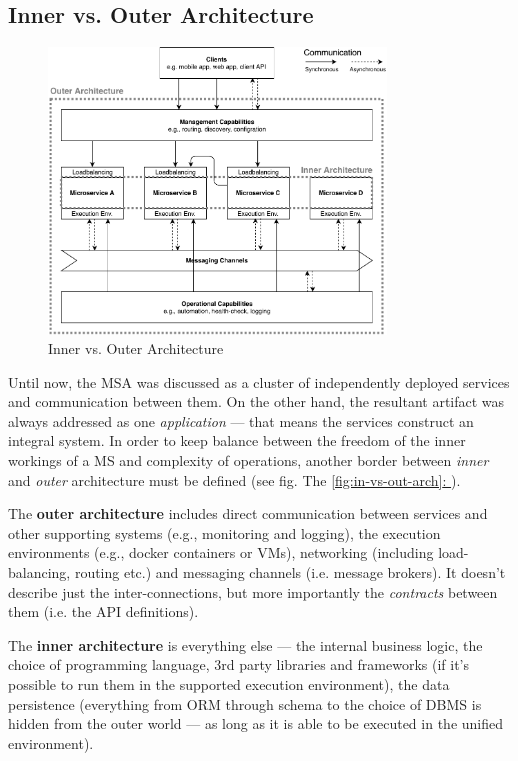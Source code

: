 \documentclass[thesis=M,english,hidelinks]{FITthesis}[2012/10/20]
\newcommand*{\fullref}[1]{\hyperref[{#1}]{\autoref*{#1}: \textit{\nameref*{#1}}}}
\begin{document}
\subsection{Inner vs. Outer Architecture}

\begin{figure}
  \centering
    \includegraphics[width=0.8\textwidth]{images/architecture_inner_vs_outer.pdf}
    \caption{Inner vs. Outer Architecture}
  \label{fig:in-vs-out-arch}
\end{figure}

Until now, the \acrshort{MSA} was discussed as a cluster of independently deployed services and communication between them. On the other hand, the resultant artifact was always addressed as one \textit{application} --- that means the services construct an integral system. In order to keep balance between the freedom of the inner workings of a \acrshort{MS} and complexity of operations, another border between \textit{inner} and \textit{outer} architecture must be defined (see fig. The \fullref{fig:in-vs-out-arch}).

The \textbf{outer architecture} includes direct communication between services and other supporting systems (e.g., monitoring and logging), the execution environments (e.g., docker containers or \acrshort{VM}s), networking (including load-balancing, routing etc.) and messaging channels (i.e. message brokers). It doesn't describe just the inter-connections, but more importantly the \textit{contracts} between them (i.e. the \acrshort{API} definitions). 

The \textbf{inner architecture} is everything else --- the internal business logic, the choice of programming language, 3rd party libraries and frameworks (if it's possible to run them in the supported execution environment), the data persistence (everything from \acrshort{ORM} through schema to the choice of \acrshort{DBMS} is hidden from the outer world --- as long as it is able to be executed in the unified environment).
\end{document}
